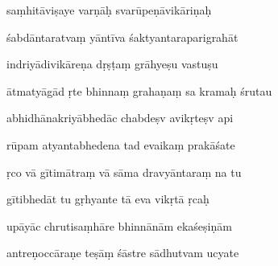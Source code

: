 \documentclass[article,12pt,a4paper]{memoir}%
\newcounter{parCount}
\begin{document}
	  
	  \pstart {} saṃhitāviṣaye varṇāḥ svarūpeṇāvikāriṇaḥ 
	{}
	\pend%
      

	  
	  \pstart \leavevmode%
	śabdāntaratvaṃ yāntīva śaktyantaraparigrahāt 
	{}
	\pend%
      

	  
	  \pstart {} indriyādivikāreṇa dṛṣṭaṃ grāhyeṣu vastuṣu 
	{}
	\pend%
      

	  
	  \pstart \leavevmode%
	ātmatyāgād ṛte bhinnaṃ grahaṇaṃ sa kramaḥ śrutau 
	{}
	\pend%
      

	  
	  \pstart {} abhidhānakriyābhedāc chabdeṣv avikṛteṣv api 
	{}
	\pend%
      

	  
	  \pstart \leavevmode%
	rūpam atyantabhedena tad evaikaṃ prakāśate 
	{}
	\pend%
      

	  
	  \pstart {} ṛco vā gītimātraṃ vā sāma dravyāntaraṃ na tu 
	{}
	\pend%
      

	  
	  \pstart \leavevmode%
	gītibhedāt tu gṛhyante tā eva vikṛtā ṛcaḥ 
	{}
	\pend%
      

	  
	  \pstart {} upāyāc chrutisaṃhāre bhinnānām ekaśeṣiṇām 
	{}
	\pend%
      

	  
	  \pstart \leavevmode%
	antreṇoccāraṇe teṣāṃ śāstre sādhutvam ucyate 
	{}
	\pend%
      
\end{document}
